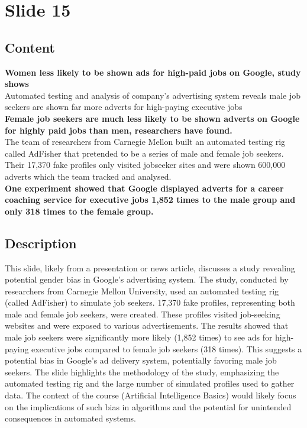 \documentclass{article}%
\begin{document}
%
\newpage%
\section{Slide 15}%
\label{sec:Slide15}%
\subsection{Content}%

\textbf{Women less likely to be shown ads for high-paid jobs on Google, study shows} \\
Automated testing and analysis of company's advertising system reveals male job seekers are shown far more adverts for high-paying executive jobs \\
\textbf{Female job seekers are much less likely to be shown adverts on Google for highly paid jobs than men, researchers have found.} \\
The team of researchers from Carnegie Mellon built an automated testing rig called AdFisher that pretended to be a series of male and female job seekers. Their 17,370 fake profiles only visited jobseeker sites and were shown 600,000 adverts which the team tracked and analysed. \\
\textbf{One experiment showed that Google displayed adverts for a career coaching service for executive jobs 1,852 times to the male group and only 318 times to the female group.}
%
\subsection{Description}%
This slide, likely from a presentation or news article, discusses a study revealing potential gender bias in Google's advertising system.  The study, conducted by researchers from Carnegie Mellon University, used an automated testing rig (called AdFisher) to simulate job seekers.  17,370 fake profiles, representing both male and female job seekers, were created.  These profiles visited job-seeking websites and were exposed to various advertisements.  The results showed that male job seekers were significantly more likely (1,852 times) to see ads for high-paying executive jobs compared to female job seekers (318 times).  This suggests a potential bias in Google's ad delivery system, potentially favoring male job seekers.  The slide highlights the methodology of the study, emphasizing the automated testing rig and the large number of simulated profiles used to gather data.  The context of the course (Artificial Intelligence Basics) would likely focus on the implications of such bias in algorithms and the potential for unintended consequences in automated systems.%
\end{document}
